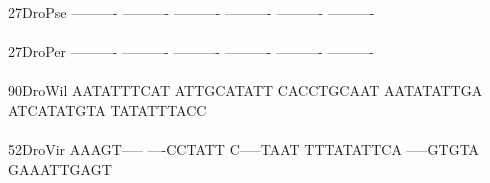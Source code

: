 \documentclass[11pt,twoside,reqno,a4paper]{article}
\begin{document}
{27\hspace*{3\charwidth}DroPse	----------	----------	----------	----------	----------	----------	\\
\hspace*{5\charwidth}\hspace*{7\charwidth}\hspace*{1\charwidth}\hspace*{1\charwidth}\hspace*{1\charwidth}\hspace*{1\charwidth}\hspace*{1\charwidth}\hspace*{1\charwidth}\\
27\hspace*{3\charwidth}DroPer	----------	----------	----------	----------	----------	----------	\\
\hspace*{5\charwidth}\hspace*{7\charwidth}\hspace*{1\charwidth}\hspace*{1\charwidth}\hspace*{1\charwidth}\hspace*{1\charwidth}\hspace*{1\charwidth}\hspace*{1\charwidth}\\
90\hspace*{3\charwidth}DroWil	AATATTTCAT	ATTGCATATT	CACCTGCAAT	AATATATTGA	ATCATATGTA	TATATTTACC	\\
\hspace*{5\charwidth}\hspace*{7\charwidth}\hspace*{1\charwidth}\hspace*{1\charwidth}\hspace*{1\charwidth}\hspace*{1\charwidth}\hspace*{1\charwidth}\hspace*{1\charwidth}\\
52\hspace*{3\charwidth}DroVir	AAAGT-----	----CCTATT	C-----TAAT	TTTATATTCA	-----GTGTA	GAAATTGAGT	\\
\hspace*{5\charwidth}\hspace*{7\charwidth}\hspace*{1\charwidth}\hspace*{1\charwidth}\hspace*{1\charwidth}\hspace*{1\charwidth}\hspace*{1\charwidth}\hspace*{1\charwidth}\\
}
\end{document}
